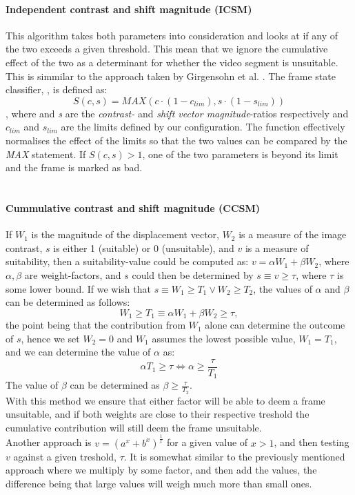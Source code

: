 \paragraph{Independent contrast and shift magnitude (ICSM)}
This algorithm takes both parameters into consideration and looks at if any of the two exceeds a given threshold. This mean that we ignore the cumulative effect of the two as a determinant for whether the video segment is unsuitable. This is simmilar to the approach taken by Girgensohn et al. \cite{Girgensohn:2000:SAH:354401.354415}. The frame state classifier, , is defined as:
\[
S(c,s)=MAX(c \cdot (1-c_{lim}), s \cdot (1-s_{lim}))
\]
, where  and \textit{s} are the \textit{contrast-} and \textit{shift vector magnitude}-ratios respectively and $c_{lim}$ and $s_{lim}$ are the limits defined by our configuration. The function effectively normalises the effect of the limits so that the two values can be compared by the \textit{MAX} statement. If $S(c,s) > 1$, one of the two parameters is beyond its limit and the frame is marked as bad.\\\\
%
\paragraph{Cummulative contrast and shift magnitude (CCSM)}
If $W_{1}$ is the magnitude of the displacement vector, $W_{2}$ is a measure of the image contrast, $s$ is either 1 (suitable) or 0 (unsuitable), and $v$ is a measure of suitability, then a suitability-value could be computed as: $v = \alpha W_{1} + \beta W_{2}$, where $\alpha,\beta$ are weight-factors, and $s$ could then be determined by $s \equiv v \ge \tau$, where $\tau$ is some lower bound. If we wish that $s \equiv W_{1} \ge T_{1} \vee W_{2} \ge T_{2}$, the values of $\alpha$ and $\beta$ can be determined as follows:
%
\[
W_{1} \ge T_{1} \equiv \alpha W_{1} + \beta W_{2} \ge \tau,
\]
%
the point being that the contribution from $W_{1}$ alone can determine the outcome of $s$, hence we set $W_{2} = 0$ and $W_{1}$ assumes the lowest possible value, $W_{1} = T_{1}$, and we can determine the value of $\alpha$ as:
%
\[
\alpha T_{1} \ge \tau \Leftrightarrow \alpha \ge \frac{\tau}{T_{1}}
\]
%
The value of $\beta$ can be determined as $\beta \ge \frac{\tau}{T_{2}}$.\\
With this method we ensure that either factor will be able to deem a frame unsuitable, and if both weights are close to their respective treshold the cumulative contribution will still deem the frame unsuitable.\\
Another approach is $v = (a^x + b^x)^{\frac{1}{x}}$ for a given value of $x > 1$, and then testing $v$ against a given treshold, $\tau$. It is somewhat similar to the previously mentioned approach where we multiply by some factor, and then add the values, the difference being that large values will weigh much more than small ones.
%
